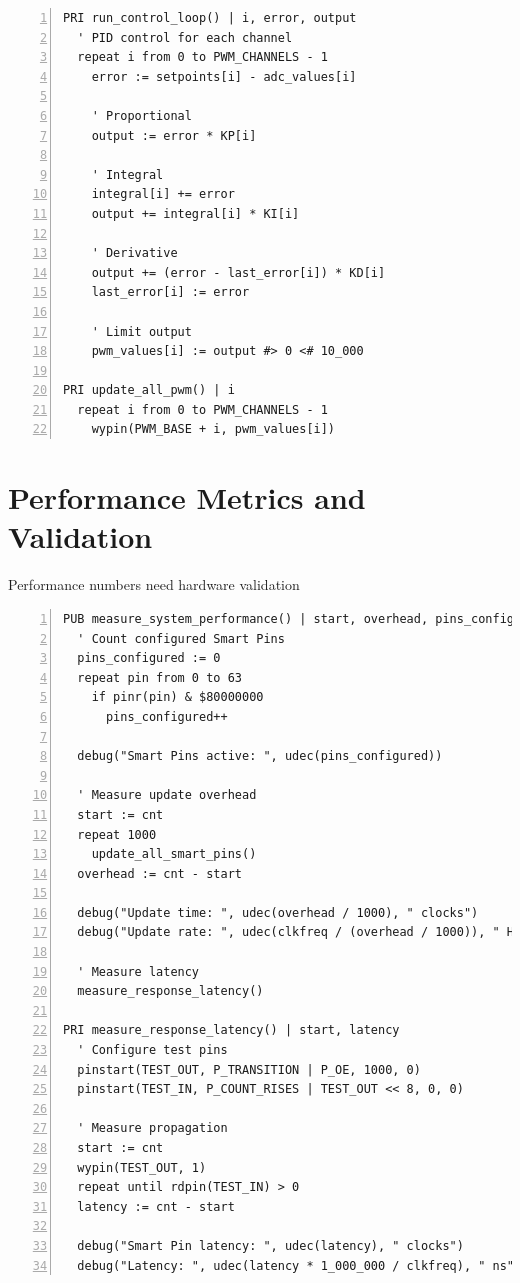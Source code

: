 \documentclass[11pt,a4paper,oneside,english]{book}
\begin{document}
\begin{Spin2Block}
\begin{Verbatim}[numbers=left,numbersep=5pt,xleftmargin=15pt]
PRI run_control_loop() | i, error, output
  ' PID control for each channel
  repeat i from 0 to PWM_CHANNELS - 1
    error := setpoints[i] - adc_values[i]
    
    ' Proportional
    output := error * KP[i]
    
    ' Integral
    integral[i] += error
    output += integral[i] * KI[i]
    
    ' Derivative
    output += (error - last_error[i]) * KD[i]
    last_error[i] := error
    
    ' Limit output
    pwm_values[i] := output #> 0 <# 10_000

PRI update_all_pwm() | i
  repeat i from 0 to PWM_CHANNELS - 1
    wypin(PWM_BASE + i, pwm_values[i])
\end{Verbatim}
\end{Spin2Block}

\hypertarget{performance-metrics-and-validation}{%
\section{Performance Metrics and
Validation}\label{performance-metrics-and-validation}}

Performance numbers need hardware validation

\begin{Spin2Block}
\begin{Verbatim}[numbers=left,numbersep=5pt,xleftmargin=15pt]
PUB measure_system_performance() | start, overhead, pins_configured
  ' Count configured Smart Pins
  pins_configured := 0
  repeat pin from 0 to 63
    if pinr(pin) & $80000000
      pins_configured++
  
  debug("Smart Pins active: ", udec(pins_configured))
  
  ' Measure update overhead
  start := cnt
  repeat 1000
    update_all_smart_pins()
  overhead := cnt - start
  
  debug("Update time: ", udec(overhead / 1000), " clocks")
  debug("Update rate: ", udec(clkfreq / (overhead / 1000)), " Hz max")
  
  ' Measure latency
  measure_response_latency()

PRI measure_response_latency() | start, latency
  ' Configure test pins
  pinstart(TEST_OUT, P_TRANSITION | P_OE, 1000, 0)
  pinstart(TEST_IN, P_COUNT_RISES | TEST_OUT << 8, 0, 0)
  
  ' Measure propagation
  start := cnt
  wypin(TEST_OUT, 1)
  repeat until rdpin(TEST_IN) > 0
  latency := cnt - start
  
  debug("Smart Pin latency: ", udec(latency), " clocks")
  debug("Latency: ", udec(latency * 1_000_000 / clkfreq), " ns")
\end{Verbatim}
\end{Spin2Block}
\end{document}
